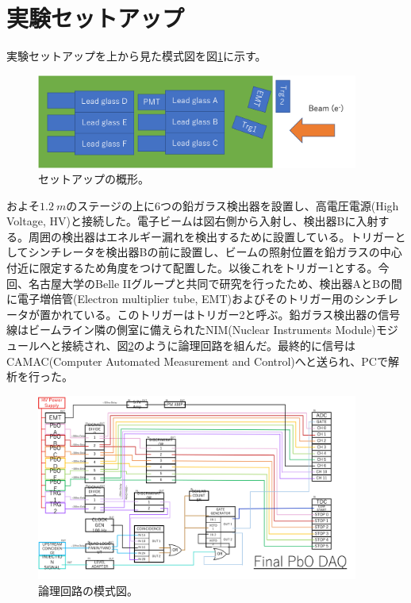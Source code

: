 \section{実験セットアップ}
実験セットアップを上から見た模式図を図\ref{calib_setup}に示す。
\begin{figure}[h]
	\begin{center}
		\includegraphics[width=300pt]{./Figure/EBESAnalysis/CalibSetup.png}
		\caption[セットアップの概形]{セットアップの概形。}
		\label{calib_setup}
	\end{center}
\end{figure}


およそ$\SI{1.2}{m}$のステージの上に6つの鉛ガラス検出器を設置し、高電圧電源(High Voltage, HV)と接続した。電子ビームは図右側から入射し、検出器Bに入射する。周囲の検出器はエネルギー漏れを検出するために設置している。トリガーとしてシンチレータを検出器Bの前に設置し、ビームの照射位置を鉛ガラスの中心付近に限定するため角度をつけて配置した。以後これをトリガー1とする。今回、名古屋大学のBelle IIグループと共同で研究を行ったため、検出器AとBの間に電子増倍管(Electron multiplier tube, EMT)およびそのトリガー用のシンチレータが置かれている。このトリガーはトリガー2と呼ぶ。鉛ガラス検出器の信号線はビームライン隣の側室に備えられたNIM(Nuclear Instruments Module)モジュールへと接続され、図\ref{NIM}のように論理回路を組んだ。最終的に信号はCAMAC(Computer Automated Measurement and Control)へと送られ、PCで解析を行った。
\begin{figure}[H]
	\begin{center}
		\includegraphics[width=300pt]{./Figure/EBESAnalysis/NIM.png}
		\caption[論理回路の模式図。]{論理回路の模式図。}
		\label{NIM}
	\end{center}
\end{figure}

